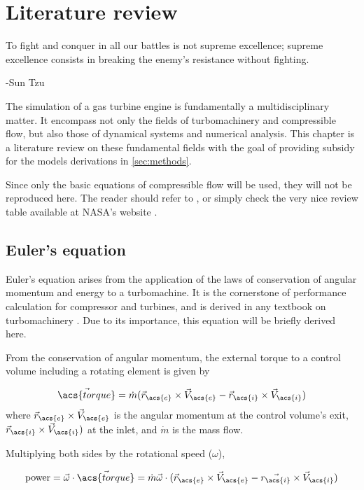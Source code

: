 \chapter{Literature review}
\label{sec:review}
\epigraph{To fight and conquer in all our battles is not supreme excellence; supreme excellence consists in breaking the enemy's resistance without fighting.}{-Sun Tzu}

The simulation of a gas turbine engine is fundamentally a multidisciplinary matter.
It encompass not only the fields of turbomachinery and compressible flow, 
but also those of dynamical systems and numerical analysis.
This chapter is a literature review on these fundamental fields with the goal of 
providing subsidy for the models derivations in \cref{sec:methods}.

Since only the basic equations of compressible flow will be used, they will not be reproduced here. 
The reader should refer to \textcite{Anderson, Shapiro}, 
or simply check the very nice review table available at NASA's website \cite{nasa_isentropic}.

\section{Euler's equation}
\label{sec:euler_equation}
Euler's equation arises from the application of the laws of conservation of angular momentum and energy to a turbomachine. It is the cornerstone of performance calculation for compressor and turbines, and is derived in any textbook on turbomachinery \cite{Lakshminarayana1996, Dixon1998, Schobeiri2004, Hill1991, Logan2003, Baskharone2006}. Due to its importance, this equation will be briefly derived here.

From the conservation of angular momentum, the external torque to a control volume including a rotating element is given by 

\begin{equation}
    \vec{\acs{torque}} = \dot{m} (\vec{r}_{\acs{e}}\cross\vec{V}_{\acs{e}} - \vec{r}_{\acs{i}}\cross\vec{V}_{\acs{i}}) 
\end{equation}
where $\vec{r}_{\acs{e}}\cross\vec{V}_{\acs{e}}$ is the angular momentum at the control volume's exit, 
$\vec{r}_{\acs{i}}\cross\vec{V}_{\acs{i}})$ at the inlet, and $\dot{m}$ is the mass flow.

Multiplying both sides by the rotational speed ($\omega$),

\begin{equation}
    \text{power} = \vec{\omega}\cdot\vec{\acs{torque}} 
                = \dot{m} \vec{\omega} \cdot (\vec{r}_{\acs{e}}\cross\vec{V}_{\acs{e}} - \vec{r_{\acs{i}}}\cross\vec{V}_{\acs{i}}) 
\end{equation}


